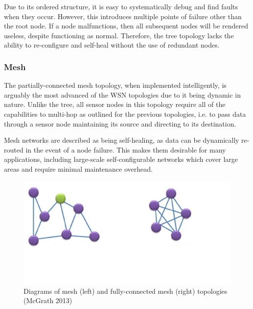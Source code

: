 Due to its ordered structure, it is easy to systematically debug and find faults when they occur. However, this introduces multiple points of failure other than the root node. If a node malfunctions, then all subsequent nodes will be rendered useless, despite functioning as normal. Therefore, the tree topology lacks the ability to re-configure and self-heal without the use of redundant nodes.


\subsubsection{Mesh}

The partially-connected mesh topology, when implemented intelligently, is arguably the most advanced of the WSN topologies due to it being dynamic in nature. Unlike the tree, all sensor nodes in this topology require all of the capabilities to multi-hop as outlined for the previous topologies, i.e. to pass data through a sensor node maintaining its source and directing to its destination.

Mesh networks are described as being self-healing, as data can be dynamically re-routed in the event of a node failure. This makes them desirable for many applications, including large-scale self-configurable networks which cover large areas and require minimal maintenance overhead.

\begin{figure}[h]
\centering
\includegraphics{Figures/mesh-fully-connected-mesh-topology.JPG}
\decoRule
\caption[Mesh and fully-connected mesh network topologies]{Diagrams of mesh (left) and fully-connected mesh (right) topologies (McGrath 2013)}
\label{fig:StarTreeTopology}
\end{figure}


